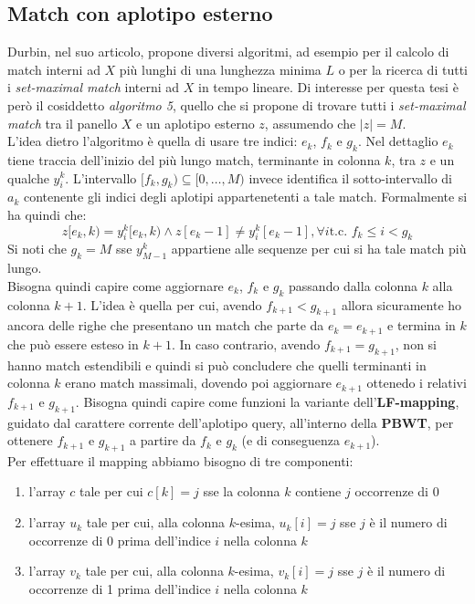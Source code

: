 \subsection{Match con aplotipo esterno}
Durbin, nel suo articolo, propone diversi algoritmi, ad esempio per il calcolo
di match interni ad $X$ più lunghi di una lunghezza minima $L$ o per la ricerca
di tutti i \textit{set-maximal match} interni ad $X$ in tempo lineare. Di
interesse per questa tesi è però il cosiddetto \textit{algoritmo 5}, quello che
si propone di trovare tutti i \textit{set-maximal match} tra il panello $X$ e un
aplotipo esterno $z$, assumendo che $|z|=M$.\\
L'idea dietro l'algoritmo è quella di usare tre indici: $e_k$, $f_k$ e
$g_k$. Nel dettaglio $e_k$ tiene traccia dell'inizio del più lungo match,
terminante in colonna $k$, tra $z$ e un qualche $y_i^k$. L'intervallo
$[f_k,g_k)\subseteq[0,\ldots,M)$ invece identifica il sotto-intervallo di
$a_k$ contenente gli indici degli aplotipi appartenetenti a tale match.
Formalmente si ha quindi che:
\[z[e_k,k)=y_i^k[e_k,k)\land z[e_k-1]\neq y_i^k[e_k-1], \forall i\mbox{
    t.c. }f_k\leq i < g_k\]
Si noti che $g_k=M$ sse $y_{M-1}^k$ appartiene alle sequenze per cui si ha tale
match più lungo.\\
Bisogna quindi capire come aggiornare $e_k$, $f_k$ e $g_k$ passando dalla
colonna $k$ alla colonna $k+1$. L'idea è quella per cui, avendo
$f_{k+1}<g_{k+1}$ allora sicuramente ho ancora delle righe che presentano un
match che parte da $e_k=e_{k+1}$ e termina in $k$ che può essere esteso in
$k+1$. In caso contrario, avendo $f_{k+1}=g_{k+1}$, non si hanno match
estendibili e quindi si può concludere che quelli terminanti in colonna $k$
erano match massimali, dovendo poi aggiornare $e_{k+1}$ ottenedo i relativi
$f_{k+1}$ e $g_{k+1}$. Bisogna quindi capire come funzioni la
variante dell'\textbf{LF-mapping}, guidato dal carattere corrente dell'aplotipo
query, all'interno della \textbf{PBWT}, per ottenere $f_{k+1}$ e $g_{k+1}$ a
partire da $f_k$ e $g_k$ (e di conseguenza $e_{k+1}$).\\ 
Per effettuare il mapping abbiamo bisogno di tre componenti:
\begin{enumerate}
  \item l'array $c$ tale per cui $c[k]=j$ sse la colonna $k$ contiene $j$
  occorrenze di 0
  \item l'array $u_k$ tale per cui, alla colonna $k$-esima, $u_k[i]=j$ sse $j$ è
  il numero di occorrenze di 0 prima dell'indice $i$ nella colonna $k$
  \item l'array $v_k$ tale per cui, alla colonna $k$-esima, $v_k[i]=j$ sse $j$ è
  il numero di occorrenze di 1 prima dell'indice $i$ nella colonna $k$ 
\end{enumerate}
